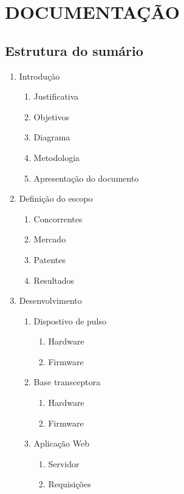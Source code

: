 \documentclass[a4paper]{article}
\begin{document}
\section{DOCUMENTAÇÃO}

\subsection{Estrutura do sumário}

\begin{enumerate}[label*=\arabic*.]

  	\item Introdução
	\begin{enumerate}[label*=\arabic*.]
		\item Justificativa
		\item Objetivos
		\item Diagrama
		\item Metodologia
		\item Apresentação do documento
	\end{enumerate}
	
	\item Definição do escopo
	\begin{enumerate}[label*=\arabic*.]
		\item Concorrentes
		\item Mercado
		\item Patentes
		\item Resultados
	\end{enumerate}

	\item Desenvolvimento
	\begin{enumerate}[label*=\arabic*.]
		\item Dispostivo de pulso
		\begin{enumerate}[label*=\arabic*.]
			\item Hardware
			\item Firmware
		\end{enumerate}
		\item Base transceptora
		\begin{enumerate}[label*=\arabic*.]
			\item Hardware
			\item Firmware
		\end{enumerate}
		\item Aplicação Web
		\begin{enumerate}[label*=\arabic*.]
			\item Servidor
			\item Requisições
		\end{enumerate}
	\end{enumerate}


\end{enumerate}
\end{document}
